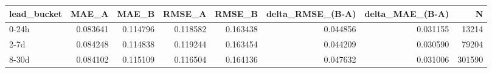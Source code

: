 \begin{tabular}{lrrrrrrr}
\toprule
lead_bucket & MAE_A & MAE_B & RMSE_A & RMSE_B & delta_RMSE_(B-A) & delta_MAE_(B-A) & N \\
\midrule
0-24h & 0.083641 & 0.114796 & 0.118582 & 0.163438 & 0.044856 & 0.031155 & 13214 \\
2-7d & 0.084248 & 0.114838 & 0.119244 & 0.163454 & 0.044209 & 0.030590 & 79204 \\
8-30d & 0.084102 & 0.115109 & 0.116504 & 0.164136 & 0.047632 & 0.031006 & 301590 \\
\bottomrule
\end{tabular}
